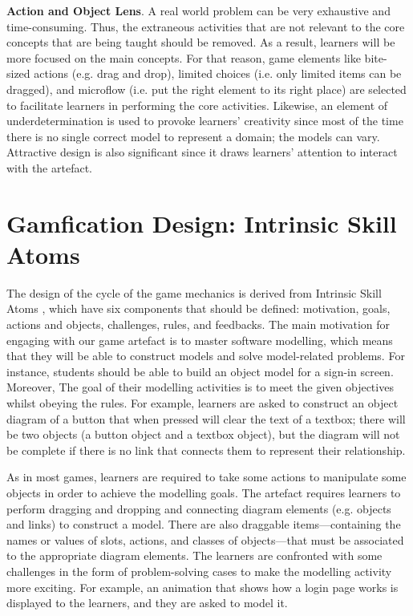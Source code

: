 \documentclass[runningheads,a4paper]{llncs}
\begin{document}
\textbf{Action and Object Lens}. A real world problem can be very exhaustive and time-consuming. Thus, the extraneous activities that are not relevant to the core concepts that are being taught should be removed. As a result, learners will be more focused on the main concepts. For that reason, game elements like bite-sized actions (e.g. drag and drop), limited choices (i.e. only limited items can be dragged), and microflow (i.e. put the right element to its right place) are selected to facilitate learners in performing the core activities. Likewise, an element of underdetermination is used to provoke learners' creativity since most of the time there is no single correct model to represent a domain; the models can vary. Attractive design is also significant since it draws learners' attention to interact with the artefact.

\section{Gamfication Design: Intrinsic Skill Atoms}
The design of the cycle of the game mechanics is derived from Intrinsic Skill Atoms \cite{deterding2015lens}, which have six components that should be defined: motivation, goals, actions and objects, challenges, rules, and feedbacks. The main motivation for engaging with our game artefact is to master software modelling, which means that they will be able to construct models and solve model-related problems. For instance, students should be able to build an object model for a sign-in screen. Moreover, The goal of their modelling activities is to meet the given objectives whilst obeying the rules. For example, learners are asked to construct an object diagram of a button that when pressed will clear the text of a textbox; there will be two objects (a button object and a textbox object), but the diagram will not be complete if there is no link that connects them to represent their relationship. 

As in most games, learners are required to take some actions to manipulate some objects in order to achieve the modelling goals. The artefact requires learners to perform dragging and dropping and connecting diagram elements (e.g. objects and links) to construct a model. There are also draggable items---containing the names or values of slots, actions, and classes of objects---that must be associated to the appropriate diagram elements. The learners are confronted with some challenges in the form of problem-solving cases to make the modelling activity more exciting. For example, an animation that shows how a login page works is displayed to the learners, and they are asked to model it. 
\end{document}
